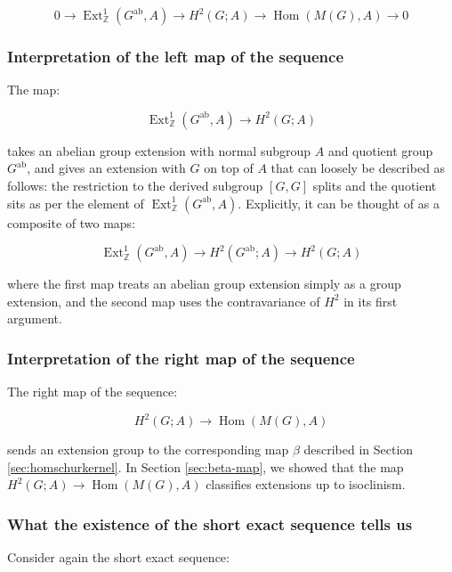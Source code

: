 \begin{equation}\label{eq:ses-uct}
  0 \to \operatorname{Ext}^1_{\mathbb{Z}}(G^{\operatorname{ab}},A) \to H^2(G;A) \to \operatorname{Hom}(M(G),A) \to 0
\end{equation}

\subsubsection{Interpretation of the left map of the sequence}\label{sec:ses-uct-left-map}

The map:

$$\operatorname{Ext}^1_{\mathbb{Z}}(G^{\operatorname{ab}},A) \to H^2(G;A)$$

takes an abelian group extension with normal subgroup $A$ and quotient
group $G^{\operatorname{ab}}$, and gives an extension with $G$ on top
of $A$ that can loosely be described as follows: the restriction to
the derived subgroup $[G,G]$ splits and the quotient sits as per the
element of
$\operatorname{Ext}^1_{\mathbb{Z}}(G^{\operatorname{ab}},A)$. Explicitly,
it can be thought of as a composite of two maps:

$$\operatorname{Ext}^1_{\mathbb{Z}}(G^{\operatorname{ab}},A) \to H^2(G^{\operatorname{ab}};A) \to H^2(G;A)$$

where the first map treats an abelian group extension simply as a
group extension, and the second map uses the contravariance of $H^2$
in its first argument.

\subsubsection{Interpretation of the right map of the sequence}\label{sec:ses-uct-right-map}

The right map of the sequence:

$$H^2(G;A) \to \operatorname{Hom}(M(G),A)$$

sends an extension group to the corresponding map $\beta$ described in
Section \ref{sec:homschurkernel}. In Section \ref{sec:beta-map}, we
showed that the map $H^2(G;A) \to \operatorname{Hom}(M(G),A)$
classifies extensions up to isoclinism.

\subsubsection{What the existence of the short exact sequence tells us}

Consider again the short exact sequence:

